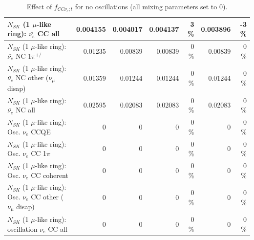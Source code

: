\begin{table}
\begin{tabular}{| l | r | r | r  r | r  r |}
                            $N_{SK}$ (1 $\mu$-like ring): $\bar{\nu_{e}}$ CC all &        0.004155 &        0.004017 &        0.004137 &        3 \%  &        0.003896 &       -3 \%  \\ 
\hline
                     $N_{SK}$ (1 $\mu$-like ring): $\bar{\nu_e}$ NC 1$\pi^{+/-}$ &         0.01235 &         0.00839 &         0.00839 &        0 \%  &         0.00839 &        0 \%  \\ 
          $N_{SK}$ (1 $\mu$-like ring): $\bar{\nu_e}$ NC other ($\nu_\mu$ disap) &         0.01359 &         0.01244 &         0.01244 &        0 \%  &         0.01244 &        0 \%  \\ 
                            $N_{SK}$ (1 $\mu$-like ring): $\bar{\nu_{e}}$ NC all &         0.02595 &         0.02083 &         0.02083 &        0 \%  &         0.02083 &        0 \%  \\ 
\hline
\hline
\hline
                                 $N_{SK}$ (1 $\mu$-like ring): Osc. $\nu_e$ CCQE &               0 &               0 &               0 &        0 \%  &               0 &        0 \%  \\ 
                            $N_{SK}$ (1 $\mu$-like ring): Osc. $\nu_e$ CC 1$\pi$ &               0 &               0 &               0 &        0 \%  &               0 &        0 \%  \\ 
                          $N_{SK}$ (1 $\mu$-like ring): Osc. $\nu_e$ CC coherent &               0 &               0 &               0 &        0 \%  &               0 &        0 \%  \\ 
           $N_{SK}$ (1 $\mu$-like ring): Osc. $\nu_e$ CC other ($\nu_\mu$ disap) &               0 &               0 &               0 &        0 \%  &               0 &        0 \%  \\ 
                        $N_{SK}$ (1 $\mu$-like ring): oscillation $\nu_e$ CC all &               0 &               0 &               0 &        0 \%  &               0 &        0 \%  \\ 
\hline
\hline
\end{tabular}
\caption{ Effect of $f_{CC\nu_e; t}$ for no oscillations (all mixing parameters set to 0). }
\label{tab:num_xsec_norm_nuetonumu_1RmuT_3f_osc_t13:0}
\end{table}
\clearpage
